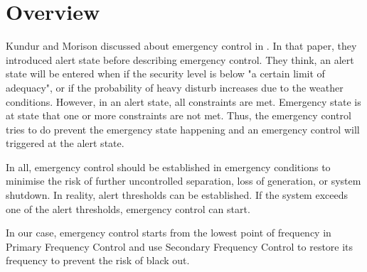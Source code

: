 \section{Overview} %

Kundur and Morison discussed about emergency control in . In that paper, they introduced alert state before describing emergency control. They think, \cite{kundur1997techniques} an alert state will be entered when if the security level is below "a certain limit of adequacy", or if the probability of heavy disturb increases due to the weather conditions. However, in an alert state, all constraints are met. Emergency state is at state that one or more constraints are not met. Thus, the emergency control tries to do prevent the emergency state happening and an emergency control will triggered at the alert state.

In all, emergency control should be established in emergency conditions to minimise the risk of further uncontrolled separation, loss of generation, or system shutdown. In reality, \cite{kundur1997techniques} alert thresholds can be established. If the system exceeds one of the alert thresholds, emergency control can start.

In our case, emergency control starts from the lowest point of frequency in Primary Frequency Control and use Secondary Frequency Control to restore its frequency to prevent the risk of black out.